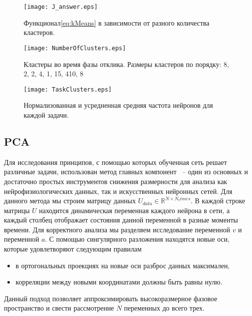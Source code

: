 \documentclass{article}
\begin{document}
\newpage
\begin{figure}[h!] \label{fig:Janswer}
  \begin{center}
    \texttt{[image: J\_answer.eps]}
    \caption{Функционал\ref{eq:kMeans} в зависимости от разного количества кластеров.}
  \end{center}
\end{figure}



\begin{figure}[h!] \label{fig:NumberOfClusters}
  \begin{center}
    \texttt{[image: NumberOfClusters.eps]}
    \caption{Кластеры во время фазы отклика. Размеры кластеров по порядку: 8, 2, 2, 4, 1, 15, 410, 8}
  \end{center}
\end{figure}

\begin{figure}[h!] \label{fig:TaskClusters}
  \begin{center}
    \texttt{[image: TaskClusters.eps]}
    \caption{Нормализованная и усредненная средняя частота нейронов для каждой задачи.}
  \end{center}
\end{figure}


\newpage
\subsection{PCA}
Для исследования принципов, с помощью которых обученная сеть решает различные задачи, использован метод главных компонент~\cite{hotelling1933analysis} -- один из основных и достаточно простых инструментов снижения размерности для анализа как нейрофизиологических данных, так и искусственных нейронных сетей. Для данного метода мы строим матрицу данных $U_{data} \in \mathbb{R}^{N \times N_times}$. В каждой строке матрицы $U$ находится динамическая переменная каждого нейрона в сети, а каждый столбец отображает состояния данной переменной в разные моменты времени. Для корректного анализа мы разделяем исследование переменной $v$ и переменной $a$. С помощью сингулярного разложения находятся новые оси, которые удовлетворяют следующим правилам
\begin{itemize}
  \item в ортогональных проекциях на новые оси разброс данных максимален,
  \item корреляции между новыми координатами должны быть равны нулю.
\end{itemize}
Данный подход позволяет аппроксимировать высокоразмерное фазовое пространство и свести рассмотрение $N$ переменных до всего трех.
\end{document}
